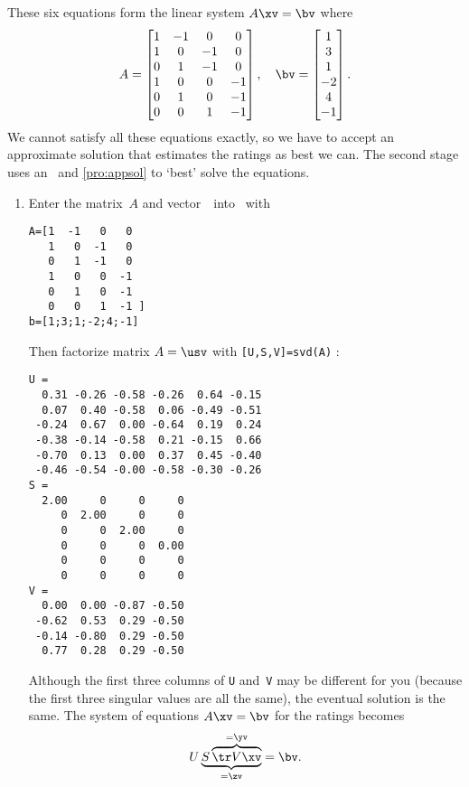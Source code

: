 \begin{example}
\begin{solution}
These six equations form the linear system \(A\xv=\bv\) where
\begin{equation*}
A=\begin{bmatrix}    1 & -1 & 0 & 0
\\ 1 & 0 & -1 & 0
\\ 0 & 1 & -1 & 0
\\ 1 & 0 & 0 & -1
\\ 0 & 1 & 0 & -1
\\ 0 & 0 & 1 & -1
 \end{bmatrix},\quad
 \bv=\begin{bmatrix} 1\\ 3\\ 1\\ -2\\ 4\\ -1 \end{bmatrix}.
\end{equation*}
We cannot satisfy all these equations exactly, so we have to accept an approximate solution that estimates the ratings as best we can.
The second stage uses an \svd\ and \cref{pro:appsol} to `best' solve the equations.
\begin{enumerate}
\item Enter the matrix~\(A\) and vector~\bv\ into \script\ with
\setbox\ajrqrbox\hbox{}%
\marginajrbox%
\begin{verbatim}
A=[1  -1   0   0
   1   0  -1   0
   0   1  -1   0
   1   0   0  -1
   0   1   0  -1
   0   0   1  -1 ]
b=[1;3;1;-2;4;-1]
\end{verbatim}
Then factorize  matrix \(A=\usv\) with \verb|[U,S,V]=svd(A)| \twodp:
\begin{verbatim}
U =
  0.31 -0.26 -0.58 -0.26  0.64 -0.15
  0.07  0.40 -0.58  0.06 -0.49 -0.51
 -0.24  0.67  0.00 -0.64  0.19  0.24
 -0.38 -0.14 -0.58  0.21 -0.15  0.66
 -0.70  0.13  0.00  0.37  0.45 -0.40
 -0.46 -0.54 -0.00 -0.58 -0.30 -0.26
S =
  2.00     0     0     0
     0  2.00     0     0
     0     0  2.00     0
     0     0     0  0.00
     0     0     0     0
     0     0     0     0
V =
  0.00  0.00 -0.87 -0.50
 -0.62  0.53  0.29 -0.50
 -0.14 -0.80  0.29 -0.50
  0.77  0.28  0.29 -0.50
\end{verbatim}
Although the first three columns of \verb|U| and~\verb|V| may be different for you (because the first three singular values are all the same),  the eventual solution is the same.
The system of equations \(A\xv=\bv\) for the ratings becomes
\begin{equation*}
U\underbrace{S\overbrace{\tr V\xv}^{=\yv}}_{=\zv}
=\bv.
\end{equation*}


\end{enumerate}
\end{solution}
\end{example}
